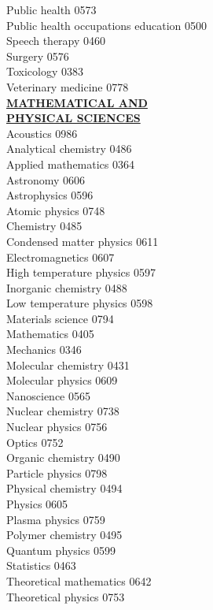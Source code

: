 \documentclass[9pt,twoside]{article}
\newcommand{\categoryheading}[1]{{\fontsize{8}{11}\selectfont \textbf{\uline{#1}}}}
\begin{document}
{\begin{multicols}{3}
Public health \hfill 0573 \\
Public health occupations
education \hfill 0500 \\
Speech therapy \hfill 0460 \\
Surgery \hfill 0576 \\
Toxicology \hfill 0383 \\
Veterinary medicine \hfill 0778 \\
\clearpage
\categoryheading{MATHEMATICAL AND \\
PHYSICAL SCIENCES} \\
Acoustics \hfill 0986 \\
Analytical chemistry \hfill 0486 \\
Applied mathematics \hfill 0364 \\
Astronomy \hfill 0606 \\
Astrophysics \hfill 0596 \\
Atomic physics \hfill 0748 \\
Chemistry \hfill 0485 \\
Condensed matter physics \hfill 0611 \\
Electromagnetics \hfill 0607 \\
High temperature physics \hfill 0597 \\
Inorganic chemistry \hfill 0488 \\
Low temperature physics \hfill 0598 \\
Materials science \hfill 0794 \\
Mathematics \hfill 0405 \\
Mechanics \hfill 0346 \\
Molecular chemistry \hfill 0431 \\
Molecular physics \hfill 0609 \\
Nanoscience \hfill 0565 \\
Nuclear chemistry \hfill 0738 \\
Nuclear physics \hfill 0756 \\
Optics \hfill 0752 \\
Organic chemistry \hfill 0490 \\
Particle physics \hfill 0798 \\
Physical chemistry \hfill 0494 \\
Physics \hfill 0605 \\
Plasma physics \hfill 0759 \\
Polymer chemistry \hfill 0495 \\
Quantum physics \hfill 0599 \\
Statistics \hfill 0463 \\
Theoretical mathematics \hfill 0642 \\
Theoretical physics \hfill 0753 \\
\columnbreak \\
\columnbreak \\
\end{multicols}
}
\end{document}
